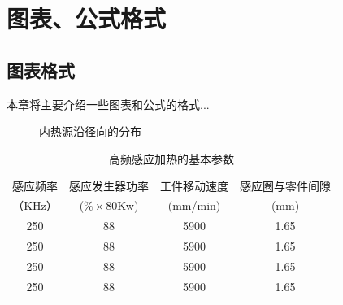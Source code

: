 \documentclass[UTF8,a4paper,12pt]{ctexart}
\numberwithin{equation}{section}
\begin{document}
\section{图表、公式格式}
\subsection{图表格式}
本章将主要介绍一些图表和公式的格式...\\

\begin{figure}[htb] 
\caption{内热源沿径向的分布}
\end{figure} %

\begin{table}[htbp]
\centering
\caption{高频感应加热的基本参数}
\small
\begin{tabular}{c c c c}
\toprule
感应频率 &感应发生器功率 & 工件移动速度  &感应圈与零件间隙\\
（KHz）&($\% \times$80Kw) &(mm/min)  &(mm)\\
\midrule
250 &88 &5900 &1.65\\

250 &88 &5900 &1.65\\

250 &88 &5900 &1.65\\

250 &88 &5900 &1.65\\



\bottomrule
\end{tabular}
\end{table}
\end{document}
